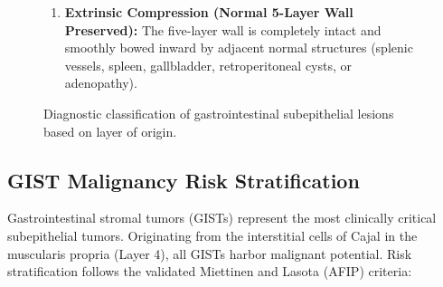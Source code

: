 \documentclass[11pt,a4paper]{article}
\begin{document}
\begin{figure}[htbp]
\begin{tcolorbox}[colback=purple!5!white,colframe=purple!60!black,title=\textbf{Algorithmic Differentiation of Subepithelial Lesions by Wall Layer},width=\linewidth]
\begin{enumerate}[leftmargin=1.5em]
    \begin{itemize}
        \item \textbf{Gastrointestinal Stromal Tumor (GIST):} Hypoechoic, origin strictly from Layer 4 (or rarely Layer 2). \textit{Malignancy Risk Factors:} Size $> 2.0\text{ cm}$, irregular lobulated borders, presence of hyperechoic foci, internal cystic spaces, and mucosal ulceration. Immunohistochemistry shows \textbf{KIT (CD117)} and \textbf{DOG-1} positivity.
        \item \textbf{True Leiomyoma:} Homogeneous, hypoechoic, origin from Layer 4 in the esophagus or colon; immunohistochemistry shows smooth muscle actin ($\text{SMA}$) and desmin positivity, with CD117 negativity.
    \end{itemize}
    \item \textbf{Extrinsic Compression (Normal 5-Layer Wall Preserved):}
    The five-layer wall is completely intact and smoothly bowed inward by adjacent normal structures (splenic vessels, spleen, gallbladder, retroperitoneal cysts, or adenopathy).
\end{enumerate}
\end{tcolorbox}
\caption{Diagnostic classification of gastrointestinal subepithelial lesions based on layer of origin.}
\label{fig:subepithelial_algorithm}
\end{figure}

\subsection{GIST Malignancy Risk Stratification}
Gastrointestinal stromal tumors (GISTs) represent the most clinically critical subepithelial tumors. Originating from the interstitial cells of Cajal in the muscularis propria (Layer 4), all GISTs harbor malignant potential. Risk stratification follows the validated Miettinen and Lasota (AFIP) criteria:
\end{document}
